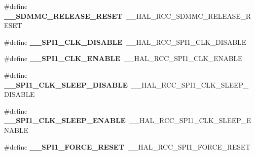 \begin{DoxyCompactItemize}
\item 
\#define {\bfseries \+\_\+\+\_\+\+S\+D\+M\+M\+C\+\_\+\+R\+E\+L\+E\+A\+S\+E\+\_\+\+R\+E\+S\+ET}~\+\_\+\+\_\+\+H\+A\+L\+\_\+\+R\+C\+C\+\_\+\+S\+D\+M\+M\+C\+\_\+\+R\+E\+L\+E\+A\+S\+E\+\_\+\+R\+E\+S\+ET\hypertarget{group___h_a_l___r_c_c___aliased_gaa5f53ce88ee0263305d9a45473927454}{}\label{group___h_a_l___r_c_c___aliased_gaa5f53ce88ee0263305d9a45473927454}

\item 
\#define {\bfseries \+\_\+\+\_\+\+S\+P\+I1\+\_\+\+C\+L\+K\+\_\+\+D\+I\+S\+A\+B\+LE}~\+\_\+\+\_\+\+H\+A\+L\+\_\+\+R\+C\+C\+\_\+\+S\+P\+I1\+\_\+\+C\+L\+K\+\_\+\+D\+I\+S\+A\+B\+LE\hypertarget{group___h_a_l___r_c_c___aliased_ga1e51511e17773155e0ef0a1d45a82829}{}\label{group___h_a_l___r_c_c___aliased_ga1e51511e17773155e0ef0a1d45a82829}

\item 
\#define {\bfseries \+\_\+\+\_\+\+S\+P\+I1\+\_\+\+C\+L\+K\+\_\+\+E\+N\+A\+B\+LE}~\+\_\+\+\_\+\+H\+A\+L\+\_\+\+R\+C\+C\+\_\+\+S\+P\+I1\+\_\+\+C\+L\+K\+\_\+\+E\+N\+A\+B\+LE\hypertarget{group___h_a_l___r_c_c___aliased_ga449f86b99a03b2929d1fa3c3895d5df9}{}\label{group___h_a_l___r_c_c___aliased_ga449f86b99a03b2929d1fa3c3895d5df9}

\item 
\#define {\bfseries \+\_\+\+\_\+\+S\+P\+I1\+\_\+\+C\+L\+K\+\_\+\+S\+L\+E\+E\+P\+\_\+\+D\+I\+S\+A\+B\+LE}~\+\_\+\+\_\+\+H\+A\+L\+\_\+\+R\+C\+C\+\_\+\+S\+P\+I1\+\_\+\+C\+L\+K\+\_\+\+S\+L\+E\+E\+P\+\_\+\+D\+I\+S\+A\+B\+LE\hypertarget{group___h_a_l___r_c_c___aliased_ga7a2a76db53db384ea1bc6e056a0190e7}{}\label{group___h_a_l___r_c_c___aliased_ga7a2a76db53db384ea1bc6e056a0190e7}

\item 
\#define {\bfseries \+\_\+\+\_\+\+S\+P\+I1\+\_\+\+C\+L\+K\+\_\+\+S\+L\+E\+E\+P\+\_\+\+E\+N\+A\+B\+LE}~\+\_\+\+\_\+\+H\+A\+L\+\_\+\+R\+C\+C\+\_\+\+S\+P\+I1\+\_\+\+C\+L\+K\+\_\+\+S\+L\+E\+E\+P\+\_\+\+E\+N\+A\+B\+LE\hypertarget{group___h_a_l___r_c_c___aliased_ga4827d1af8789446e75722131ef5fcd4c}{}\label{group___h_a_l___r_c_c___aliased_ga4827d1af8789446e75722131ef5fcd4c}

\item 
\#define {\bfseries \+\_\+\+\_\+\+S\+P\+I1\+\_\+\+F\+O\+R\+C\+E\+\_\+\+R\+E\+S\+ET}~\+\_\+\+\_\+\+H\+A\+L\+\_\+\+R\+C\+C\+\_\+\+S\+P\+I1\+\_\+\+F\+O\+R\+C\+E\+\_\+\+R\+E\+S\+ET\hypertarget{group___h_a_l___r_c_c___aliased_gab4534be76388b22aba929a389ce90961}{}\label{group___h_a_l___r_c_c___aliased_gab4534be76388b22aba929a389ce90961}


\end{DoxyCompactItemize}
